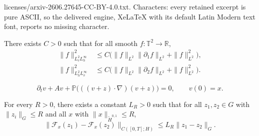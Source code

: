 \documentclass[10pt,a4paper]{amsart}
\newcommand{\R}{\mathbb{R}}
\newcommand{\T}{\mathbb{T}}
\begin{document}
licenses/arxiv-2606.27645-CC-BY-4.0.txt. Characters: every retained excerpt is pure ASCII, so the delivered engine, XeLaTeX with its default Latin Modern text font, reports no missing character.
\begin{lemma}\label{lem:GN}
  There exists \(C>0\) such that for all smooth \(f:\T^2\to\R\),
  \begin{align*}
    \|f\|_{L^2_v L^\infty_h}^2 &\le C\bigl(\|f\|_{L^2}\|\partial_1 f\|_{L^2} + \|f\|_{L^2}^2\bigr),\\
    \|f\|_{L^2_h L^\infty_v}^2 &\le C\bigl(\|f\|_{L^2}\|\partial_2 f\|_{L^2} + \|f\|_{L^2}^2\bigr).
  \end{align*}
\end{lemma}

\begin{equation}\label{eq:aux_v}
  \partial_t v + A v + \mathbb P\bigl(((v+z)\cdot\nabla)(v+z)\bigr) = 0,
  \qquad v(0)=x .
\end{equation}

\begin{proposition}\label{prop:Lip}
  For every $R>0$, there exists a constant $L_R>0$ such that for all
  $z_1,z_2\in G$ with $\|z_i\|_G\le R$ and all $x$ with $\|x\|_{\widetilde H^{0,1}}\le R$,
  \[
    \|\mathcal F_x(z_1) - \mathcal F_x(z_2)\|_{C([0,T];H)} \le L_R \|z_1-z_2\|_G .
  \]
\end{proposition}
\end{document}

